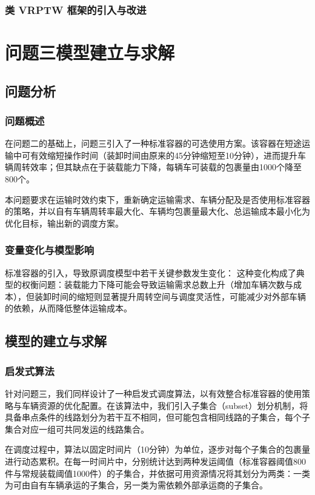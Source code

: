 \documentclass{MMCStyle}
\begin{document}
\subsubsection{类 VRPTW 框架的引入与改进}
\section{问题三模型建立与求解}
\subsection{问题分析}
\subsubsection{问题概述}
在问题二的基础上，问题三引入了一种标准容器的可选使用方案。该容器在短途运输中可有效缩短操作时间（装卸时间由原来的45分钟缩短至10分钟），进而提升车辆周转效率；但其缺点在于装载能力下降，每辆车可装载的包裹量由1000个降至800个。

本问题要求在运输时效约束下，重新确定运输需求、车辆分配及是否使用标准容器的策略，并以自有车辆周转率最大化、车辆均包裹量最大化、总运输成本最小化为优化目标，输出新的调度方案。
\subsubsection{变量变化与模型影响}
标准容器的引入，导致原调度模型中若干关键参数发生变化：
这种变化构成了典型的权衡问题：装载能力下降可能会导致运输需求总数上升（增加车辆次数与成本），但装卸时间的缩短则显著提升周转空间与调度灵活性，可能减少对外部车辆的依赖，从而降低整体运输成本。

\subsection{模型的建立与求解}
\subsubsection{启发式算法}
针对问题三，我们同样设计了一种启发式调度算法，以有效整合标准容器的使用策略与车辆资源的优化配置。在该算法中，我们引入子集合（subset）划分机制，将具备串点条件的线路划分为若干互不相同，但可能包含相同线路的子集合，每个子集合对应一组可共同发运的线路集合。

在调度过程中，算法以固定时间片（10分钟）为单位，逐步对每个子集合的包裹量进行动态累积。在每一时间片中，分别统计达到两种发运阈值（标准容器阈值800件与常规装载阈值1000件）的子集合，并依据可用资源情况将其划分为两类：一类为可由自有车辆承运的子集合，另一类为需依赖外部承运商的子集合。
\end{document}
